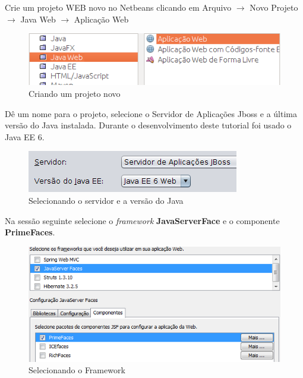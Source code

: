 \documentclass[12pt,a4paper]{article}
\begin{document}
Crie um projeto WEB novo no Netbeans clicando em Arquivo $\rightarrow$ Novo Projeto $\rightarrow$ Java Web $\rightarrow$ Aplicação Web

\begin{figure}[H]
    \centering
    \includegraphics[scale=0.60]{NovoProjetoWeb.png}
    \caption{Criando um projeto novo}
    \label{imagemNovoProjetoWeb}
\end{figure}

Dê um nome para o projeto, selecione o Servidor de Aplicações Jboss e a última versão do Java instalada. Durante o desenvolvimento deste tutorial foi usado o Java EE 6.

\begin{figure}[H]
    \centering
    \includegraphics[scale=0.60]{jboss.png}
    \caption{Selecionando o servidor e a versão do Java}
    \label{imagemServidorVersaoJava}
\end{figure}

Na sessão seguinte selecione o \textit{framework} \textbf{JavaServerFace} e o componente \textbf{PrimeFaces}.

\begin{figure}[H]
    \centering
    \includegraphics[scale=0.80]{SelectJavaServerFace.png}
    \caption{Selecionando o Framework}
    \label{imagemSelecionandoJavaServerFace}
\end{figure}

\end{document}
